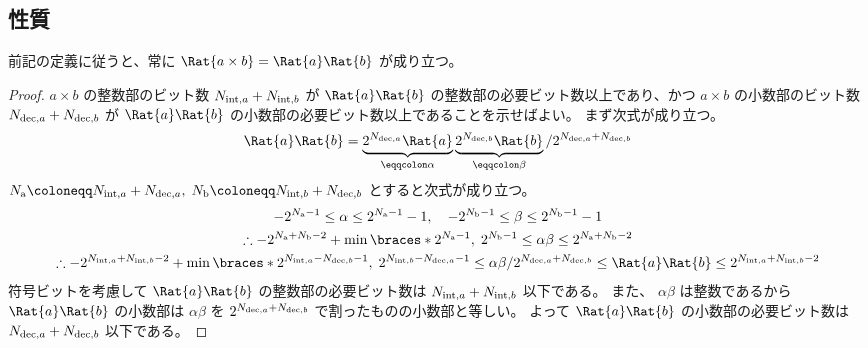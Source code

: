         \subsection{性質}
            \newcommand{\Na}{{N_\text{a}}}
            \newcommand{\Nb}{{N_\text{b}}}
            前記の定義に従うと、常に $\Rat{a\times b} = \Rat{a}\Rat{b}$ が成り立つ。
            \begin{proof}
                \quad\par
                $a\times b$ の整数部のビット数 ${N_{\text{int},a}}+{N_{\text{int},b}}$ が $\Rat{a}\Rat{b}$ の整数部の必要ビット数以上であり、かつ $a\times b$ の小数部のビット数 ${N_{\text{dec},a}}+{N_{\text{dec},b}}$ が $\Rat{a}\Rat{b}$ の小数部の必要ビット数以上であることを示せばよい。
                まず次式が成り立つ。
                \[ \Rat{a}\Rat{b} = \underbrace{2^\Nda\Rat{a}}_{\eqqcolon\alpha}\underbrace{2^\Ndb\Rat{b}}_{\eqqcolon\beta}/2^{\Nda+\Ndb} \]
                $\Na \coloneqq \Nia + \Nda,\; \Nb \coloneqq \Nib + \Ndb$ とすると次式が成り立つ。
                \begin{gather*}
                    -2^{\Na-1} \leq \alpha \leq 2^{\Na-1}-1,\quad -2^{\Nb-1} \leq \beta \leq 2^{\Nb-1}-1 \\
                    \therefore -2^{\Na+\Nb-2} + \min \braces*{2^{\Na-1},\; 2^{\Nb-1}} \leq \alpha\beta \leq 2^{\Na+\Nb-2} \\
                    \therefore -2^{\Nia+\Nib-2} + \min \braces*{2^{\Nia-\Ndb-1},\; 2^{\Nib-\Nda-1}} \leq \alpha\beta/2^{\Nda+\Ndb} \leq \Rat{a}\Rat{b} \leq 2^{\Nia+\Nib-2}
                \end{gather*}
                符号ビットを考慮して $\Rat{a}\Rat{b}$ の整数部の必要ビット数は ${N_{\text{int},a}}+{N_{\text{int},b}}$ 以下である。
                また、 $\alpha\beta$ は整数であるから $\Rat{a}\Rat{b}$ の小数部は $\alpha\beta$ を $2^{{N_{\text{dec},a}}+{N_{\text{dec},b}}}$ で割ったものの小数部と等しい。
                よって $\Rat{a}\Rat{b}$ の小数部の必要ビット数は ${N_{\text{dec},a}}+{N_{\text{dec},b}}$ 以下である。
            \end{proof}
